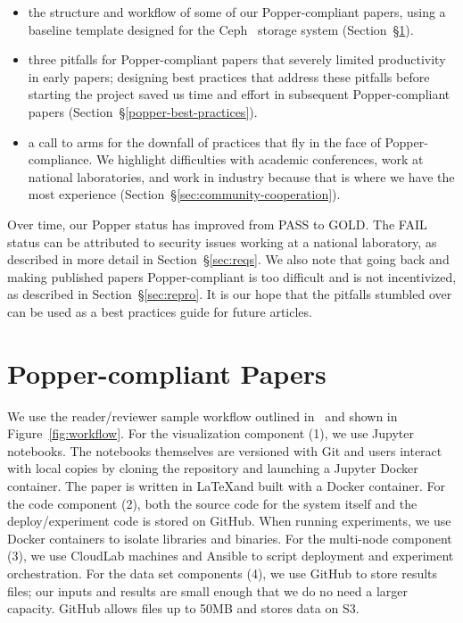 \begin{itemize}

  \item the structure and workflow of some of our Popper-compliant papers,
using a baseline template designed for the Ceph~\cite{weil:osdi2006-ceph}
storage system (Section~\S\ref{sec:popper-compliant-papers}).

  \item three pitfalls for Popper-compliant papers that severely limited
productivity in early papers; designing best practices that address these
pitfalls before starting the project saved us time and effort in subsequent
Popper-compliant papers (Section~\S\ref{popper-best-practices}).

  \item a call to arms for the downfall of practices that fly in the face of
Popper-compliance. We highlight difficulties with academic conferences, work at
national laboratories, and work in industry because that is where we have the
most experience (Section~\S\ref{sec:community-cooperation}).

\end{itemize}

Over time, our Popper status has improved from PASS to GOLD. The FAIL status
can be attributed to security issues working at a national laboratory, as
described in more detail in Section~\S\ref{sec:reqs}. We also note that going
back and making published papers Popper-compliant is too difficult and is not
incentivized, as described in Section~\S\ref{sec:repro}. It is our hope that
the pitfalls stumbled over can be used as a best practices guide for future
articles.

\section{Popper-compliant Papers}
\label{sec:popper-compliant-papers}

We use the reader/reviewer sample workflow outlined
in~\cite{jimenez:ipdpsw17-popper} and shown in Figure~\ref{fig:workflow}. For
the visualization component (1), we use Jupyter notebooks. The notebooks
themselves are versioned with Git and users interact with local copies by
cloning the repository and launching a Jupyter Docker container. The paper is
written in \LaTeX and built with a Docker container.  For the code component
(2), both the source code for the system itself and the deploy/experiment code
is stored on GitHub. When running experiments, we use Docker containers to
isolate libraries and binaries. For the multi-node component (3), we use
CloudLab machines and Ansible to script deployment and experiment
orchestration. For the data set components (4), we use GitHub to store results
files; our inputs and results are small enough that we do no need a larger
capacity.  GitHub allows files up to 50MB and stores data on S3.

